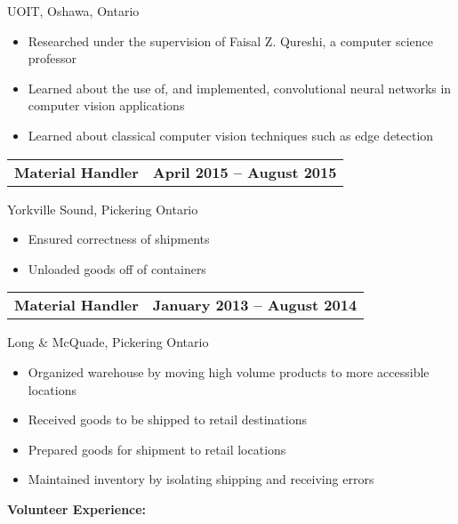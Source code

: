 \documentclass[]{article}
\begin{document}
%
UOIT, Oshawa, Ontario
%
\begin{itemize}
\item
  Researched under the supervision of Faisal Z. Qureshi, a computer
  science professor
\item
  Learned about the use of, and implemented, convolutional neural networks in computer
  vision applications
\item
  Learned about classical computer vision techniques such as edge detection
\end{itemize}
\pagebreak %
\begin{tabu} to 
  \textbf{Material Handler} &
  \textbf{April 2015 -- August 2015}\\
\end{tabu}
%
Yorkville Sound, Pickering Ontario
%
\begin{itemize}
\item
  Ensured correctness of shipments
\item
  Unloaded goods off of containers
\end{itemize}
\begin{tabu} to 
  \textbf{Material Handler} & \textbf{January 2013 -- August 2014} \\
\end{tabu}
%
Long \& McQuade, Pickering Ontario
%
\begin{itemize}
\item
  Organized warehouse by moving high volume products to more
  accessible locations
\item
  Received goods to be shipped to retail destinations
\item
  Prepared goods for shipment to retail locations
\item
  Maintained inventory by isolating shipping and receiving errors
\end{itemize}
\begin{large} \textbf{Volunteer Experience:} \end{large} \\
\end{document}

